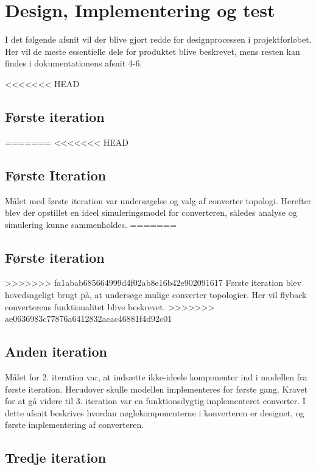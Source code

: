 \chapter{Design, Implementering og test}
I det følgende afsnit vil der blive gjort redde for designprocessen i projektforløbet. Her vil de meste essentielle dele for produktet blive beskrevet, mens resten kan findes i dokumentationens afsnit 4-6.


<<<<<<< HEAD
\section{Første iteration} 
=======
<<<<<<< HEAD
\section{Første Iteration}
Målet med første iteration var undersøgelse og valg af converter topologi. Herefter blev der opstillet en ideel simuleringsmodel for converteren, således analyse og simulering kunne sammenholdes. 
=======
\section{Første iteration}
>>>>>>> fa1abab685664999d4f02ab8e16b42e902091617
Første iteration blev hovedsageligt brugt på, at undersøge mulige converter topologier. Her vil flyback converterens funktionalitet blive beskrevet. 
>>>>>>> ae0636983c77876a6412832acac46881f4d92c01




\section{Anden iteration}
Målet for 2. iteration var, at indsætte ikke-ideele komponenter ind i modellen fra første iteration. Herudover skulle modellen implementeres for første gang. 
Kravet for at gå videre til 3. iteration var en funktionsdygtig implementeret converter. 
I dette afsnit beskrives hvordan nøglekomponenterne i konverteren er designet, og første implementering af converteren.





\section{Tredje iteration}







	
	
